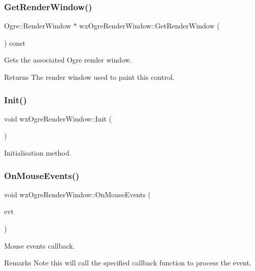 \subsubsection{\texorpdfstring{Get\+Render\+Window()}{GetRenderWindow()}}
{\footnotesize\ttfamily Ogre\+::\+Render\+Window $\ast$ wx\+Ogre\+Render\+Window\+::\+Get\+Render\+Window (\begin{DoxyParamCaption}{ }\end{DoxyParamCaption}) const}

Gets the associated Ogre render window. \begin{DoxyReturn}{Returns}
The render window used to paint this control. 
\end{DoxyReturn}
\mbox{\label{classwx_ogre_render_window_a4cff3f54eed10b38b14aa4c7a8d7a4e3}} 
\subsubsection{\texorpdfstring{Init()}{Init()}}
{\footnotesize\ttfamily void wx\+Ogre\+Render\+Window\+::\+Init (\begin{DoxyParamCaption}{ }\end{DoxyParamCaption})\hspace{0.3cm}{\ttfamily [virtual]}}

Initialisation method. \mbox{\label{classwx_ogre_render_window_a75627af5e05691526b99524af5feaa5e}} 
\subsubsection{\texorpdfstring{On\+Mouse\+Events()}{OnMouseEvents()}}
{\footnotesize\ttfamily void wx\+Ogre\+Render\+Window\+::\+On\+Mouse\+Events (\begin{DoxyParamCaption}\item[{wx\+Mouse\+Event \&}]{evt }\end{DoxyParamCaption})\hspace{0.3cm}{\ttfamily [virtual]}}

Mouse events callback. \begin{DoxyRemark}{Remarks}
Note this will call the specified callback function to process the event. 
\end{DoxyRemark}


